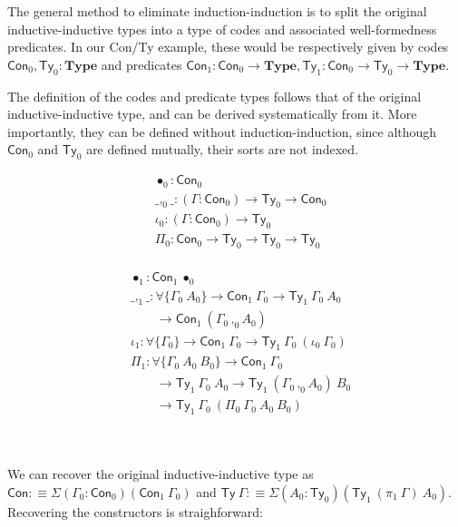 \documentclass{easychair}
\newcommand{\GG}{\Gamma}
\newcommand{\mType}{\mathbf{Type}}
\begin{document}
The general method to eliminate induction-induction is to split the original
inductive-inductive types into a type of codes and associated well-formedness
predicates. In our \textsf{Con/Ty} example, these would be respectively given by
codes $\textsf{Con}_0, \textsf{Ty}_0 : \mType$ and predicates $\textsf{Con}_1 :
\textsf{Con}_0 \to \mType, \textsf{Ty}_1 : \textsf{Con}_0 \to \textsf{Ty}_0 \to
\mType$.

The definition of the codes and predicate types follows that of the original
inductive-inductive type, and can be derived systematically from it. More
importantly, they can be defined without induction-induction, since although
$\textsf{Con}_0$ and $\textsf{Ty}_0$ are defined mutually, their sorts are not
indexed.

\begin{minipage}{0.4\textwidth}
\begin{align*}
  & \bullet_0 : \textsf{Con}_0 \\
  & \_,_0\_ : (\GG : \textsf{Con}_0) \to \textsf{Ty}_0 \to \textsf{Con}_0 \\
  & \iota_0 : (\GG : \textsf{Con}_0) \to \textsf{Ty}_0 \\
  & \Pi_0 : \textsf{Con}_0 \to \textsf{Ty}_0 \to \textsf{Ty}_0 \to \textsf{Ty}_0 \\
\end{align*}
\end{minipage}
\begin{minipage}{0.5\textwidth}
\begin{align*}
  & \bullet_1 : \textsf{Con}_1\ \bullet_0 \\
  & \_,_1\_ : \forall\{\GG_0\ A_0\} \to \textsf{Con}_1\ \GG_0 \to \textsf{Ty}_1\ \GG_0\ A_0 \\
  & \qquad \to \textsf{Con}_1\ (\GG_0 \,,_0 A_0) \\
  & \iota_1 : \forall\{\GG_0\} \to \textsf{Con}_1\ \GG_0 \to \textsf{Ty}_1\ \GG_0\ (\iota_0\ \GG_0) \\
  & \Pi_1 : \forall\{\GG_0\ A_0\ B_0\} \to \textsf{Con}_1\ \GG_0 \\
  & \qquad \to \textsf{Ty}_1\ \GG_0\ A_0 \to \textsf{Ty}_1\ (\GG_0\, ,_0 A_0)\ B_0 \\
  & \qquad \to \textsf{Ty}_1\ \GG_0\ (\Pi_0\ \GG_0\ A_0\ B_0)
\end{align*}
\end{minipage}
\\
~
\\

We can recover the original inductive-inductive type as $\textsf{Con} :\equiv
\Sigma (\GG_0 : \textsf{Con}_0)(\textsf{Con}_1\ \GG_0)$ and $\textsf{Ty}\ \GG
:\equiv \Sigma(A_0 :
\textsf{Ty}_0)(\textsf{Ty}_1\ (\pi_1\ \GG)\ A_0)$. Recovering the constructors
is straighforward:
\end{document}
